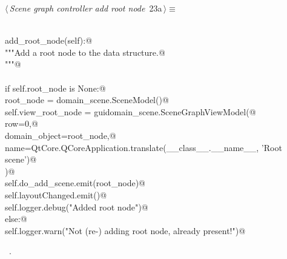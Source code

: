 \documentclass[
    a4paper,      %
    10pt,         %
    openright,    %
    notitlepage,  %
    parskip=half, %
]{scrreprt}       %
\theoremstyle{definition}                    %
\begin{document}
\begin{flushleft} \small
\begin{minipage}{\linewidth}\label{scrap18}\raggedright\small
{} $\langle\,${\itshape Scene graph controller add root node}\nobreak\ {\footnotesize {23a}}$\,\rangle\equiv$
\vspace{-1exm}
\begin{list}{}{} \item
\mbox{}\lstinline@@\\
\mbox{}\lstinline@def add_root_node(self):@\\
\mbox{}\lstinline@    """Add a root node to the data structure.@\\
\mbox{}\lstinline@    """@\\
\mbox{}\lstinline@@\\
\mbox{}\lstinline@    if self.root_node is None:@\\
\mbox{}\lstinline@        root_node = domain_scene.SceneModel()@\\
\mbox{}\lstinline@        self.view_root_node = guidomain_scene.SceneGraphViewModel(@\\
\mbox{}\lstinline@            row=0,@\\
\mbox{}\lstinline@            domain_object=root_node,@\\
\mbox{}\lstinline@            name=QtCore.QCoreApplication.translate(__class__.__name__, 'Root scene')@\\
\mbox{}\lstinline@        )@\\
\mbox{}\lstinline@        self.do_add_scene.emit(root_node)@\\
\mbox{}\lstinline@        self.layoutChanged.emit()@\\
\mbox{}\lstinline@        self.logger.debug("Added root node")@\\
\mbox{}\lstinline@    else:@\\
\mbox{}\lstinline@        self.logger.warn("Not (re-) adding root node, already present!")@\\
\mbox{}\lstinline@@{\NWsep}
\end{list}
\vspace{-1.5ex}
\footnotesize
\begin{list}{}{\setlength{\itemsep}{-\parsep}\setlength{\itemindent}{-\leftmargin}}
\item \NWtxtMacroRefIn\ .

\item{}
\end{list}
\end{minipage}\vspace{4ex}
\end{flushleft}
\end{document}
